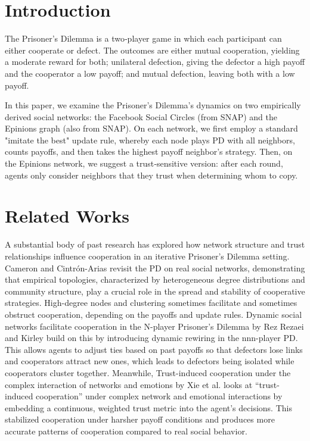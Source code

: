 \section{Introduction}
The Prisoner’s Dilemma is a two‐player game in which each participant can either cooperate or defect. The outcomes are either mutual cooperation, yielding a moderate reward for both; unilateral defection, giving the defector a high payoff and the cooperator a low payoff; and mutual defection, leaving both with a low payoff. 

In this paper, we examine the Prisoner's Dilemma’s dynamics on two empirically derived social networks: the Facebook Social Circles (from SNAP) and the Epinions graph (also from SNAP). On each network, we first employ a standard "imitate the best" update rule, whereby each node plays PD with all neighbors, counts payoffs, and then takes the highest payoff neighbor's strategy. Then, on the Epinions network, we suggest a trust‐sensitive version: after each round, agents only consider neighbors that they trust when determining whom to copy.

\section{Related Works}
A substantial body of past research has explored how network structure and trust relationships influence cooperation in an iterative Prisoner’s Dilemma setting. Cameron and Cintrón-Arias revisit the PD on real social networks, demonstrating that empirical topologies, characterized by heterogeneous degree distributions and community structure, play a crucial role in the spread and stability of cooperative strategies. High-degree nodes and clustering sometimes facilitate and sometimes obstruct cooperation, depending on the payoffs and update rules. Dynamic social networks facilitate cooperation in the N-player Prisoner’s Dilemma by Rez Rezaei and Kirley build on this by introducing dynamic rewiring in the nnn-player PD. This allows agents to adjust ties based on past payoffs so that defectors lose links and cooperators attract new ones, which leads to defectors being isolated while cooperators cluster together. Meanwhile, Trust-induced cooperation under the complex interaction of networks and emotions by Xie et al. looks at “trust-induced cooperation” under complex network and emotional interactions by embedding a continuous, weighted trust metric into the agent’s decisions. This stabilized cooperation under harsher payoff conditions and produces more accurate patterns of cooperation compared to real social behavior.


